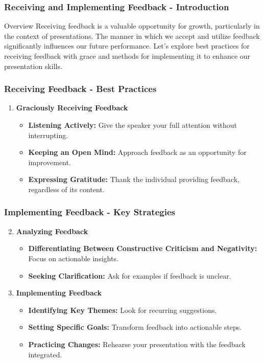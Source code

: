 \documentclass[aspectratio=169]{beamer}
\begin{document}
\begin{frame}[fragile]
    \frametitle{Receiving and Implementing Feedback - Introduction}
    \begin{block}{Overview}
        Receiving feedback is a valuable opportunity for growth, particularly in the context of presentations. 
        The manner in which we accept and utilize feedback significantly influences our future performance. 
        Let's explore best practices for receiving feedback with grace and methods for implementing it to enhance our presentation skills.
    \end{block}
\end{frame}

\begin{frame}[fragile]
    \frametitle{Receiving Feedback - Best Practices}
    \begin{enumerate}
        \item \textbf{Graciously Receiving Feedback}
            \begin{itemize}
                \item \textbf{Listening Actively:} Give the speaker your full attention without interrupting.
                \item \textbf{Keeping an Open Mind:} Approach feedback as an opportunity for improvement.
                \item \textbf{Expressing Gratitude:} Thank the individual providing feedback, regardless of its content.
            \end{itemize}
    \end{enumerate}
\end{frame}

\begin{frame}[fragile]
    \frametitle{Implementing Feedback - Key Strategies}
    \begin{enumerate}
        \setcounter{enumi}{1}
        \item \textbf{Analyzing Feedback}
            \begin{itemize}
                \item \textbf{Differentiating Between Constructive Criticism and Negativity:} Focus on actionable insights.
                \item \textbf{Seeking Clarification:} Ask for examples if feedback is unclear.
            \end{itemize}
        \item \textbf{Implementing Feedback}
            \begin{itemize}
                \item \textbf{Identifying Key Themes:} Look for recurring suggestions.
                \item \textbf{Setting Specific Goals:} Transform feedback into actionable steps.
                \item \textbf{Practicing Changes:} Rehearse your presentation with the feedback integrated.
            \end{itemize}
    \end{enumerate}
\end{frame}
\end{document}

